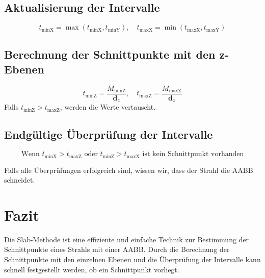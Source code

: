 \documentclass{article}
\begin{document}
	\subsection{Aktualisierung der Intervalle}
	\begin{equation}
		t_{\text{minX}} = \max(t_{\text{minX}}, t_{\text{minY}}), \quad t_{\text{maxX}} = \min(t_{\text{maxX}}, t_{\text{maxY}})
	\end{equation}
	
	\subsection{Berechnung der Schnittpunkte mit den z-Ebenen}
	\begin{equation}
		t_{\text{minZ}} = \frac{M_{\text{minZ}}}{\mathbf{d}_z}, \quad t_{\text{maxZ}} = \frac{M_{\text{maxZ}}}{\mathbf{d}_z}
	\end{equation}
	Falls \( t_{\text{minZ}} > t_{\text{maxZ}} \), werden die Werte vertauscht.
	
	\subsection{Endgültige Überprüfung der Intervalle}
	\begin{equation}
		\text{Wenn } t_{\text{minX}} > t_{\text{maxZ}} \text{ oder } t_{\text{minZ}} > t_{\text{maxX}} \text{ ist kein Schnittpunkt vorhanden}
	\end{equation}
	
	Falls alle Überprüfungen erfolgreich sind, wissen wir, dass der Strahl die AABB schneidet.
	
	\section{Fazit}
	Die Slab-Methode ist eine effiziente und einfache Technik zur Bestimmung der Schnittpunkte eines Strahls mit einer AABB. Durch die Berechnung der Schnittpunkte mit den einzelnen Ebenen und die Überprüfung der Intervalle kann schnell festgestellt werden, ob ein Schnittpunkt vorliegt.
	
\end{document}
